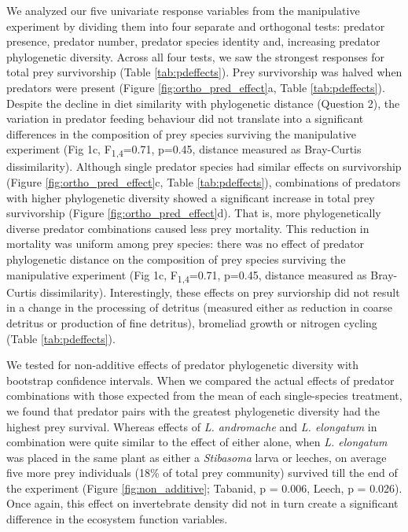 \documentclass[11pt]{article}
\begin{document}
We analyzed our five univariate response variables from the manipulative
experiment by dividing them into four separate and orthogonal tests:
predator presence, predator number, predator species identity and,
increasing predator phylogenetic diversity. Across all four tests, we
saw the strongest responses for total prey survivorship (Table \ref{tab:pdeffects}). Prey
survivorship was halved when predators were present (Figure \ref{fig:ortho_pred_effect}a, Table \ref{tab:pdeffects}). Despite the decline in diet similarity with phylogenetic distance
(Question 2), the variation in predator feeding behaviour did not
translate into a significant differences in the composition of prey
species surviving the manipulative experiment (Fig 1c,
F\textsubscript{1,4}=0.71, p=0.45, distance measured as Bray-Curtis
dissimilarity). Although single predator species had similar effects on
survivorship (Figure \ref{fig:ortho_pred_effect}c, Table \ref{tab:pdeffects}), combinations of predators with higher
phylogenetic diversity showed a significant increase in total prey
survivorship (Figure \ref{fig:ortho_pred_effect}d). That is, more phylogenetically diverse predator
combinations caused less prey mortality. This reduction in mortality was uniform among prey species: there was no effect of predator phylogenetic distance on the composition of prey species surviving the manipulative experiment (Fig 1c,
F\textsubscript{1,4}=0.71, p=0.45, distance measured as Bray-Curtis
dissimilarity). Interestingly, these effects on
prey surviorship did not result in a change in the processing of
detritus (measured either as reduction in coarse detritus or production
of fine detritus), bromeliad growth or nitrogen cycling (Table \ref{tab:pdeffects}).

We tested for non-additive effects of predator phylogenetic diversity
with bootstrap confidence intervals. When we compared the actual effects
of predator combinations with those expected from the mean of each
single-species treatment, we found that predator pairs with the greatest
phylogenetic diversity had the highest prey survival. Whereas effects of
\emph{L. andromache} and \emph{L. elongatum} in combination were quite
similar to the effect of either alone, when \emph{L. elongatum} was
placed in the same plant as either a \emph{Stibasoma} larva or leeches,
on average five more prey individuals (18\% of total prey community)
survived till the end of the experiment (Figure \ref{fig:non_additive}; Tabanid, p = 0.006,
Leech, p = 0.026). Once again, this effect on invertebrate density did
not in turn create a significant difference in the ecosystem function variables.
\end{document}
